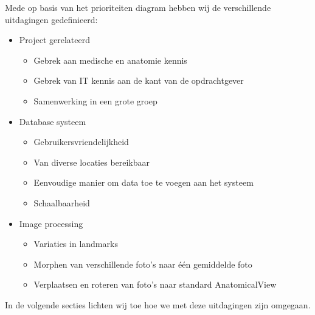 Mede op basis van het prioriteiten diagram hebben wij de verschillende uitdagingen gedefinieerd:
\begin{itemize}
  \item Project gerelateerd
  \begin{itemize}
    \item Gebrek aan medische en anatomie kennis
    \item Gebrek van IT kennis aan de kant van de opdrachtgever
    \item Samenwerking in een grote groep
  \end{itemize}
  \item Database systeem
  \begin{itemize}
    \item Gebruikersvriendelijkheid
    \item Van diverse locaties bereikbaar
    \item Eenvoudige manier om data toe te voegen aan het systeem
    \item Schaalbaarheid
  \end{itemize}
  \item Image processing
  \begin{itemize}
    \item Variaties in landmarks
    \item Morphen van verschillende foto's naar \'{e}\'{e}n gemiddelde foto
    \item Verplaatsen en roteren van foto's naar standard AnatomicalView
  \end{itemize}
\end{itemize}
In de volgende secties lichten wij toe hoe we met deze uitdagingen zijn omgegaan.
